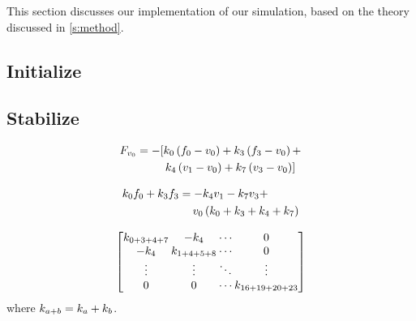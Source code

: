 This section discusses our implementation of our simulation, based on the theory discussed in \cref{s:method}. 

\subsection{Initialize}

\subsection{Stabilize}

\begin{equation}\label{eq:implementation:forceOnVo}
	\begin{split}
	F_{v_{0}} 	& = - [				k_{0} \left(f_{0} - v_{0}\right) +
												k_{3} \left(f_{3} - v_{0}\right) + \\
							& \quad\quad\;\;	k_{4} \left(v_{1} - v_{0}\right)  +
												k_{7} \left(v_{3} - v_{0}\right) ]
	\end{split}
\end{equation}


\begin{equation}\label{eq:implementation:forceOnVoVersimpled}
	\begin{split}
	k_{0}f_{0} + k_{3}f_{3} 
		&= - k_{4}v_{1} - k_{7}v_{3} + \\
		& \quad\: v_{0} \left( k_{0} + k_{3} + k_{4} + k_{7} \right)
	\end{split}
\end{equation}

\begin{equation}\label{eq:implementation:rhs}
{
	\arraycolsep=1pt
	\begin{bmatrix}
		\spring{0 + 3 + 4 + 7}	& -\spring{4}			& \cdots & 0\\
		- \spring{4} 			& \spring{1 + 4+ 5 + 8}	& \cdots & 0\\
		\vdots					& \vdots 				& \ddots & \vdots\\
		0						& 0 					& \cdots & \spring{16 + 19 + 20 + 23}\\
	\end{bmatrix}
}
\end{equation}
where $k_{a + b} = k_{a} + k_{b}$. 

